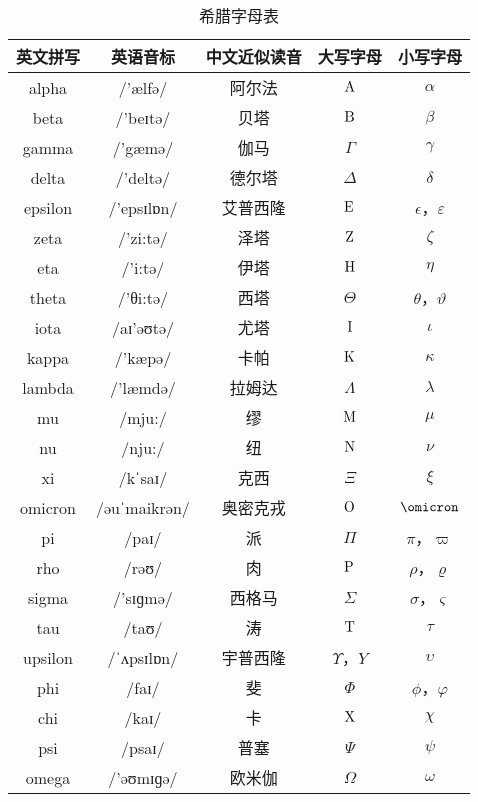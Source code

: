 \begin{table}[ht]
\centering
\caption{希腊字母表}\label{tab_GreekL1}
\begin{tabular}{|c|c|c|c|c|}
\hline
英文拼写 & 英语音标 & 中文近似读音 & 大写字母 & 小写字母 \\
\hline
alpha & /'ælfə/&阿尔法 & ${\rm A}$ & $\alpha$ \\
\hline
beta & /'beɪtə/&贝塔 & ${\rm B}$ & $\beta$ \\
\hline
gamma & /'gæmə/&伽马 & $\Gamma$ & $\gamma$ \\
\hline
delta & /'deltə/&德尔塔 &$\Delta$ & $\delta$ \\
\hline
epsilon & /'epsɪlɒn/&艾普西隆 & ${\rm E}$ & $\epsilon$，$\varepsilon$ \\
\hline
zeta & /'zi:tə/&泽塔 & ${\rm Z}$ & $\zeta$ \\
\hline
eta & /'i:tə/&伊塔 & ${\rm H}$ & $\eta$ \\
\hline
theta & /'θi:tə/&西塔 & $\Theta$ & $\theta$，$\vartheta$ \\
\hline
iota & /aɪ'əʊtə/&尤塔 & ${\rm I}$ & $\iota$ \\
\hline
kappa & /'kæpə/&卡帕 & ${\rm K}$ & $\kappa$ \\
\hline
lambda & /'læmdə/&拉姆达 &$\Lambda$ & $\lambda$ \\
\hline
mu & /mju:/&缪 & ${\rm M}$ & $\mu$ \\
\hline
nu & /nju:/&纽 & ${\rm N}$ & $\nu$ \\
\hline
xi & /kˈsaɪ/&克西 &$\Xi$ & $\xi$ \\
\hline
omicron &/əuˈmaikrən/&奥密克戎 & ${\rm O}$ & $\omicron$ \\
\hline
pi & /paɪ/&派 &$\Pi$ & $\pi$，$\varpi$ \\
\hline
rho & /rəʊ/&肉 & ${\rm P}$ & $\rho$，$\varrho$ \\
\hline
sigma & /'sɪɡmə/&西格马 & $\Sigma$ & $\sigma$，$\varsigma$ \\
\hline
tau & /taʊ/&涛 & ${\rm T}$ & $\tau$ \\
\hline
upsilon & /ˈʌpsɪlɒn/&宇普西隆 & $\Upsilon$，${Y}$ & $\upsilon$ \\
\hline
phi & /faɪ/&斐 &$\Phi$ & $\phi$，$\varphi$ \\
\hline
chi & /kaɪ/&卡 & ${\rm X}$ & $\chi$ \\
\hline
psi & /psaɪ/&普塞 & $\Psi$ & $\psi$ \\
\hline
omega & /'əʊmɪɡə/&欧米伽 & $\Omega$ & $\omega$ \\
\hline
\end{tabular}
\end{table}


